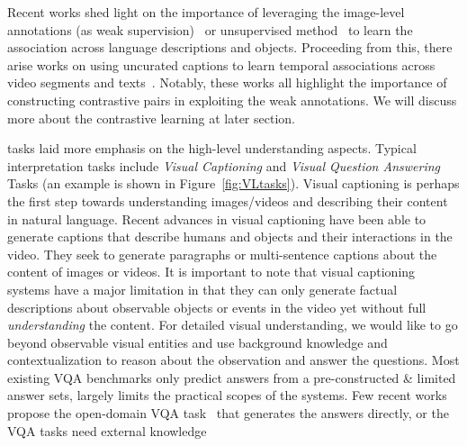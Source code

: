 Recent works shed light on the importance of leveraging the image-level annotations (as weak supervision)~\citep{fang2018modularizedtextual,fang2018weakly} or unsupervised method~\citep{yeh2018unsupervised} to learn the association across language descriptions and objects. Proceeding from this, there arise works on using uncurated captions to learn temporal associations across video segments and texts~\citep{miech2019end,sun2019videobert}. Notably, these works all highlight the importance of constructing contrastive pairs in exploiting the weak annotations. We will discuss more about the contrastive learning at later section. 

 tasks laid more emphasis on the high-level understanding aspects. Typical interpretation tasks include \emph{Visual Captioning} and \emph{Visual Question Answering} Tasks (an example is shown in Figure~\ref{fig:VLtasks}). Visual captioning is perhaps the first step towards understanding images/videos and describing their content in natural language.
Recent advances in visual captioning have been able to generate captions that describe humans and objects and their interactions in the video.
They seek to generate paragraphs or multi-sentence captions about the content of images or videos.
It is important to note that visual captioning systems have a major limitation in that they can only generate factual descriptions about observable objects or events in the video yet without full \emph{understanding} the content. For detailed visual understanding, we would like to go beyond observable visual entities and use background knowledge and contextualization to reason about the observation and answer the questions. Most existing VQA benchmarks only predict answers from a pre-constructed \& limited answer sets, largely limits the practical scopes of the systems. Few recent works propose the open-domain VQA task~\citep{chang2021webqa} that generates the answers directly, or the VQA tasks need external knowledge~\citep{wang2017fvqa,zellers2019vcr,marino2019ok,garcia2020knowit,7298682}


